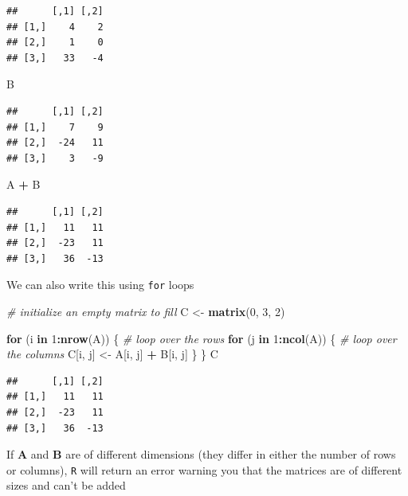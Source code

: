 \documentclass[
]{book}
\newenvironment{Shaded}{\begin{snugshade}}{\end{snugshade}}
\newcommand{\CommentTok}[1]{\textcolor[rgb]{0.56,0.35,0.01}{\textit{#1}}}
\newcommand{\ControlFlowTok}[1]{\textcolor[rgb]{0.13,0.29,0.53}{\textbf{#1}}}
\newcommand{\DecValTok}[1]{\textcolor[rgb]{0.00,0.00,0.81}{#1}}
\newcommand{\KeywordTok}[1]{\textcolor[rgb]{0.13,0.29,0.53}{\textbf{#1}}}
\newcommand{\NormalTok}[1]{#1}
\newcommand{\OperatorTok}[1]{\textcolor[rgb]{0.81,0.36,0.00}{\textbf{#1}}}
\newcommand{\StringTok}[1]{\textcolor[rgb]{0.31,0.60,0.02}{#1}}
\theoremstyle{definition}
\theoremstyle{definition}
\theoremstyle{definition}
\theoremstyle{definition}
\theoremstyle{remark}
\begin{document}
\begin{verbatim}
##      [,1] [,2]
## [1,]    4    2
## [2,]    1    0
## [3,]   33   -4
\end{verbatim}

\begin{Shaded}
\begin{Highlighting}[]
\NormalTok{B}
\end{Highlighting}
\end{Shaded}

\begin{verbatim}
##      [,1] [,2]
## [1,]    7    9
## [2,]  -24   11
## [3,]    3   -9
\end{verbatim}

\begin{Shaded}
\begin{Highlighting}[]
\NormalTok{A }\OperatorTok{+}\StringTok{ }\NormalTok{B}
\end{Highlighting}
\end{Shaded}

\begin{verbatim}
##      [,1] [,2]
## [1,]   11   11
## [2,]  -23   11
## [3,]   36  -13
\end{verbatim}

We can also write this using \texttt{for} loops

\begin{Shaded}
\begin{Highlighting}[]
\CommentTok{# initialize an empty matrix to fill}
\NormalTok{C <-}\StringTok{ }\KeywordTok{matrix}\NormalTok{(}\DecValTok{0}\NormalTok{, }\DecValTok{3}\NormalTok{, }\DecValTok{2}\NormalTok{)}

\ControlFlowTok{for}\NormalTok{ (i }\ControlFlowTok{in} \DecValTok{1}\OperatorTok{:}\KeywordTok{nrow}\NormalTok{(A)) \{         }\CommentTok{# loop over the rows}
    \ControlFlowTok{for}\NormalTok{ (j }\ControlFlowTok{in} \DecValTok{1}\OperatorTok{:}\KeywordTok{ncol}\NormalTok{(A)) \{     }\CommentTok{# loop over the columns}
\NormalTok{        C[i, j] <-}\StringTok{ }\NormalTok{A[i, j] }\OperatorTok{+}\StringTok{ }\NormalTok{B[i, j]}
\NormalTok{    \}}
\NormalTok{\}}
\NormalTok{C}
\end{Highlighting}
\end{Shaded}

\begin{verbatim}
##      [,1] [,2]
## [1,]   11   11
## [2,]  -23   11
## [3,]   36  -13
\end{verbatim}

If \(\mathbf{A}\) and \(\mathbf{B}\) are of different dimensions (they differ in either the number of rows or columns), \texttt{R} will return an error warning you that the matrices are of different sizes and can't be added
\end{document}
